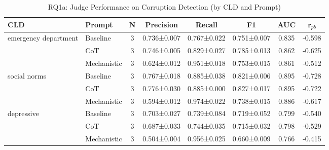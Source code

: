 \begin{table}[htbp]
\centreing
\caption{RQ1a: Judge Performance on Corruption Detection (by CLD and Prompt)}
\label{tab:rq1a_main}
\begin{tabular}{llcccccc}
\toprule
\textbf{CLD} & \textbf{Prompt} & \textbf{N} & \textbf{Precision} & \textbf{Recall} & \textbf{F1} & \textbf{AUC} & \textbf{r$_{pb}$} \\
\midrule
emergency department & Baseline & 3 & 0.736±0.007 & 0.767±0.022 & 0.751±0.007 & 0.835 & -0.598 \\
 & CoT & 3 & 0.746±0.005 & 0.829±0.027 & 0.785±0.013 & 0.862 & -0.625 \\
 & Mechanistic & 3 & 0.624±0.012 & 0.951±0.018 & 0.753±0.015 & 0.861 & -0.512 \\
\midrule
social norms & Baseline & 3 & 0.767±0.018 & 0.885±0.038 & 0.821±0.006 & 0.895 & -0.728 \\
 & CoT & 3 & 0.776±0.030 & 0.885±0.000 & 0.827±0.017 & 0.895 & -0.722 \\
 & Mechanistic & 3 & 0.594±0.012 & 0.974±0.022 & 0.738±0.015 & 0.886 & -0.617 \\
\midrule
depressive & Baseline & 3 & 0.703±0.027 & 0.739±0.084 & 0.719±0.052 & 0.799 & -0.540 \\
 & CoT & 3 & 0.687±0.033 & 0.744±0.035 & 0.715±0.032 & 0.798 & -0.529 \\
 & Mechanistic & 3 & 0.504±0.004 & 0.956±0.025 & 0.660±0.009 & 0.766 & -0.415 \\
\midrule
\bottomrule
\end{tabular}
\end{table}